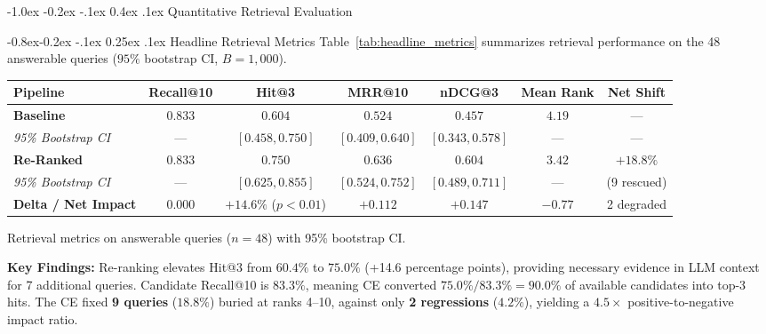 \documentclass[11pt,a4paper]{article}
\makeatletter
\providecommand{\toprule}{\hline\hline}
\providecommand{\midrule}{\hline}
\providecommand{\bottomrule}{\hline\hline}
\newcommand{\captionof}[2]{%
  \def\@captype{#1}%
  \caption{#2}%
}
\renewcommand\section{\@startsection{section}{1}{\z@}%
  {-1.0ex \@plus -0.2ex \@minus -.1ex}%
  {0.4ex \@plus .1ex}%
  {\normalfont\large\bfseries\color{primaryblue}}}
\renewcommand\subsection{\@startsection{subsection}{2}{\z@}%
  {-0.8ex\@plus -0.2ex \@minus -.1ex}%
  {0.25ex \@plus .1ex}%
  {\normalfont\normalsize\bfseries\color{primaryblue}}}
\newenvironment{tightcenter}{%
  \setlength\topsep{1.2pt}%
  \setlength\parskip{0pt}%
  \begin{center}%
}{%
  \end{center}%
}
\makeatother
\begin{document}
\section{Quantitative Retrieval Evaluation}
\label{sec:quantitative}

\subsection{Headline Retrieval Metrics}
Table~\ref{tab:headline_metrics} summarizes retrieval performance on the 48 answerable queries ($95\%$ bootstrap CI, $B=1,000$).

\begin{tightcenter}
\footnotesize
\setlength{\tabcolsep}{4pt}
\renewcommand{\arraystretch}{0.93}
\begin{tabular}{lcccccc}
\toprule
\textbf{Pipeline} & \textbf{Recall@10} & \textbf{Hit@3} & \textbf{MRR@10} & \textbf{nDCG@3} & \textbf{Mean Rank} & \textbf{Net Shift} \\
\midrule
\textbf{Baseline} & $0.833$ & $0.604$ & $0.524$ & $0.457$ & $4.19$ & --- \\
\textit{95\% Bootstrap CI} & --- & $[0.458, 0.750]$ & $[0.409, 0.640]$ & $[0.343, 0.578]$ & --- & --- \\
\midrule
\textbf{Re-Ranked} & $\mathbf{0.833}$ & $\mathbf{0.750}$ & $\mathbf{0.636}$ & $\mathbf{0.604}$ & $\mathbf{3.42}$ & $\mathbf{+18.8\%}$ \\
\textit{95\% Bootstrap CI} & --- & $[0.625, 0.855]$ & $[0.524, 0.752]$ & $[0.489, 0.711]$ & --- & (9 rescued) \\
\midrule
\textbf{Delta / Net Impact} & $0.000$ & $\mathbf{+14.6\%}$ ($p<0.01$) & $\mathbf{+0.112}$ & $\mathbf{+0.147}$ & $\mathbf{-0.77}$ & 2 degraded \\
\bottomrule
\end{tabular}
\vspace{0.10em}
\captionof{table}{Retrieval metrics on answerable queries ($n=48$) with 95\% bootstrap CI.}
\label{tab:headline_metrics}
\end{tightcenter}

\textbf{Key Findings:} Re-ranking elevates Hit@3 from $60.4\%$ to $75.0\%$ (+14.6 percentage points), providing necessary evidence in LLM context for 7 additional queries. Candidate Recall@10 is $83.3\%$, meaning CE converted $75.0\% / 83.3\% = 90.0\%$ of available candidates into top-3 hits. The CE fixed \textbf{9 queries} ($18.8\%$) buried at ranks 4--10, against only \textbf{2 regressions} ($4.2\%$), yielding a $4.5\times$ positive-to-negative impact ratio.
\end{document}
